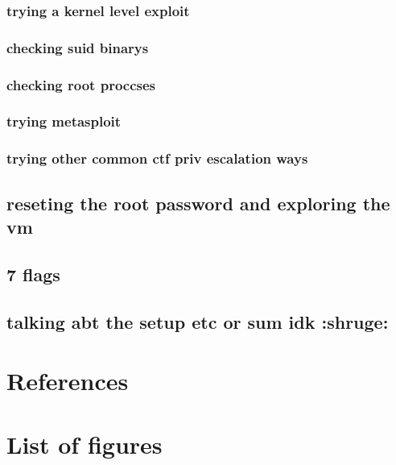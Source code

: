 \documentclass[a4paper]{article}
\begin{document}
\subsubsection{trying a kernel level exploit}
\subsubsection{checking suid binarys}
\subsubsection{checking root proccses}
\subsubsection{trying metasploit}
\subsubsection{trying other common ctf priv escalation ways}
\subsection{reseting the root password and exploring the vm}
\subsection{7 flags}
\subsection{talking abt the setup etc or sum idk :shruge:}

\newpage
\section{References}

\newpage
\section{List of figures}

\listoffigures
\end{document}
